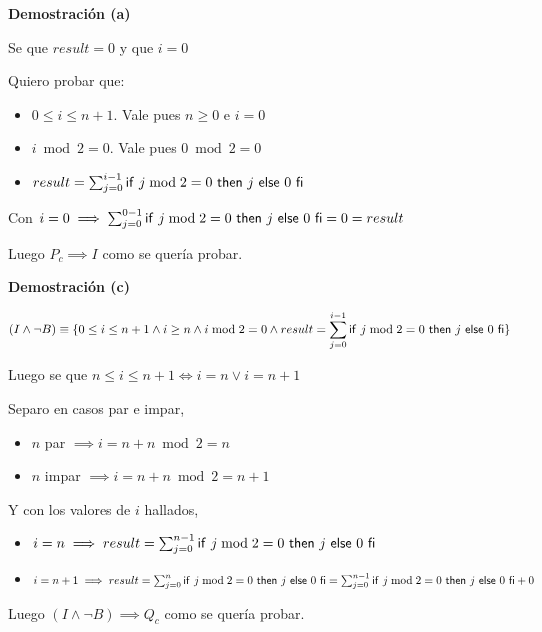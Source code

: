 \textbf{Demostración (a)}

Se que $result = 0 $ y que $ i = 0 $

Quiero probar que:
\begin{itemize}
    \item $ 0 \leq i \leq n+1 $. Vale pues $n \geq 0$ e $ i = 0 $
    \item $ i \bmod 2 = 0 $. Vale pues $ 0 \bmod 2 = 0 $
    \item $ result = \sum_{j = 0}^{i-1}\mathsf{if}\ j \bmod 2 = 0\ \mathsf{then}\ j\ \mathsf{else}\ 0\ \mathsf{fi} $
\end{itemize}

Con $ i = 0 \implies \sum_{j = 0}^{0-1}\mathsf{if}\ j \bmod 2 = 0\ \mathsf{then}\ j\ \mathsf{else}\ 0\ \mathsf{fi} = 0= result $

Luego $ P_c \implies I $ como se quería probar.

\textbf{Demostración (c)}

\begin{align*}
    (I \wedge \neg B) \equiv \{ 0 \leq i \leq n+1 \wedge i\geq n \wedge i \bmod 2 = 0 \wedge result = \sum_{j = 0}^{i-1}\mathsf{if}\ j \bmod 2 = 0\ \mathsf{then}\ j\ \mathsf{else}\ 0\ \mathsf{fi}  \}
\end{align*}

Luego se que $ n \leq i \leq n+1 \iff i =n \vee i = n+1 $

Separo en casos par e impar,
\begin{itemize}
    \item $ n$ par $\implies i = n+n \bmod 2 = n $
    \item $ n$ impar $\implies i = n+n \bmod 2 = n+1 $
\end{itemize}

Y con los valores de $i$ hallados,
\begin{itemize}
    \item $ i = n \implies result = \sum_{j = 0}^{n-1}\mathsf{if}\ j \bmod 2 = 0\ \mathsf{then}\ j\ \mathsf{else}\ 0\ \mathsf{fi} $
    \item $ i = n + 1 \implies result = \sum_{j = 0}^{n}\mathsf{if}\ j \bmod 2 = 0\ \mathsf{then}\ j\ \mathsf{else}\ 0\ \mathsf{fi} = \sum_{j = 0}^{n-1}\mathsf{if}\ j \bmod 2 = 0\ \mathsf{then}\ j\ \mathsf{else}\ 0\ \mathsf{fi} + 0 $
\end{itemize}

Luego $ (I \wedge \neg B) \implies Q_c $ como se quería probar.


